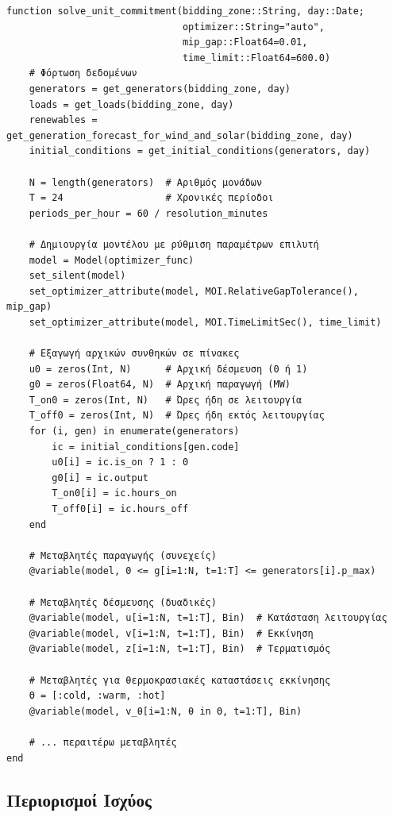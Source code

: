 \begin{samepage}
\begin{verbatim}
function solve_unit_commitment(bidding_zone::String, day::Date;
                               optimizer::String="auto",
                               mip_gap::Float64=0.01,
                               time_limit::Float64=600.0)
    # Φόρτωση δεδομένων
    generators = get_generators(bidding_zone, day)
    loads = get_loads(bidding_zone, day)
    renewables = get_generation_forecast_for_wind_and_solar(bidding_zone, day)
    initial_conditions = get_initial_conditions(generators, day)

    N = length(generators)  # Αριθμός μονάδων
    T = 24                  # Χρονικές περίοδοι
    periods_per_hour = 60 / resolution_minutes

    # Δημιουργία μοντέλου με ρύθμιση παραμέτρων επιλυτή
    model = Model(optimizer_func)
    set_silent(model)
    set_optimizer_attribute(model, MOI.RelativeGapTolerance(), mip_gap)
    set_optimizer_attribute(model, MOI.TimeLimitSec(), time_limit)

    # Εξαγωγή αρχικών συνθηκών σε πίνακες
    u0 = zeros(Int, N)      # Αρχική δέσμευση (0 ή 1)
    g0 = zeros(Float64, N)  # Αρχική παραγωγή (MW)
    T_on0 = zeros(Int, N)   # Ώρες ήδη σε λειτουργία
    T_off0 = zeros(Int, N)  # Ώρες ήδη εκτός λειτουργίας
    for (i, gen) in enumerate(generators)
        ic = initial_conditions[gen.code]
        u0[i] = ic.is_on ? 1 : 0
        g0[i] = ic.output
        T_on0[i] = ic.hours_on
        T_off0[i] = ic.hours_off
    end

    # Μεταβλητές παραγωγής (συνεχείς)
    @variable(model, 0 <= g[i=1:N, t=1:T] <= generators[i].p_max)

    # Μεταβλητές δέσμευσης (δυαδικές)
    @variable(model, u[i=1:N, t=1:T], Bin)  # Κατάσταση λειτουργίας
    @variable(model, v[i=1:N, t=1:T], Bin)  # Εκκίνηση
    @variable(model, z[i=1:N, t=1:T], Bin)  # Τερματισμός

    # Μεταβλητές για θερμοκρασιακές καταστάσεις εκκίνησης
    Θ = [:cold, :warm, :hot]
    @variable(model, v_θ[i=1:N, θ in Θ, t=1:T], Bin)

    # ... περαιτέρω μεταβλητές
end
\end{verbatim}
\end{samepage}

\subsection{Περιορισμοί Ισχύος}
\label{subsec:impl-uc-power-constraints}

